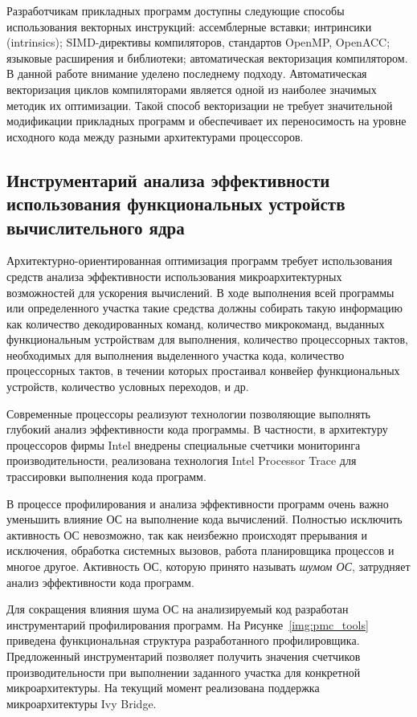 Разработчикам прикладных программ доступны следующие способы использования векторных инструкций: ассемблерные вставки; интринсики (intrinsics); SIMD-директивы компиляторов, стандартов OpenMP, OpenACC; языковые расширения и библиотеки; автоматическая векторизация компилятором.
В данной работе внимание уделено последнему подходу. Автоматическая векторизация циклов компиляторами является одной из наиболее значимых методик их оптимизации. Такой способ векторизации не требует значительной модификации прикладных программ и обеспечивает их переносимость на уровне исходного кода между разными архитектурами процессоров.

\subsection{Инструментарий анализа эффективности использования функциональных устройств вычислительного ядра}
Архитектурно-ориентированная оптимизация программ требует использования средств анализа эффективности использования микроархитектурных возможностей для ускорения вычислений. В ходе выполнения всей программы или определенного участка такие средства должны собирать такую информацию как количество декодированных команд, количество микрокоманд, выданных функциональным устройствам для выполнения, количество процессорных тактов, необходимых для выполнения выделенного участка кода, количество процессорных тактов, в течении которых простаивал конвейер функциональных устройств, количество условных переходов, и др.

Современные процессоры реализуют технологии позволяющие выполнять глубокий анализ эффективности кода программы. В частности, в архитектуру процессоров фирмы Intel внедрены специальные счетчики мониторинга производительности, реализована технология Intel Processor Trace для трассировки выполнения кода программ.%

В процессе профилирования и анализа эффективности программ очень важно уменьшить влияние ОС на выполнение кода вычислений. Полностью исключить активность ОС невозможно, так как неизбежно происходят прерывания и исключения, обработка системных вызовов, работа планировщика процессов и многое другое. Активность ОС, которую принято называть \textit{шумом ОС}, затрудняет анализ эффективности кода программ.

Для сокращения влияния шума ОС на анализируемый код разработан инструментарий профилирования программ. На Рисунке~\ref{img:pmc_tools} приведена функциональная структура разработанного профилировщика. Предложенный инструментарий позволяет получить значения счетчиков производительности при выполнении заданного участка для конкретной микроархитектуры. На текущий момент реализована поддержка микроархитектуры Ivy Bridge.


